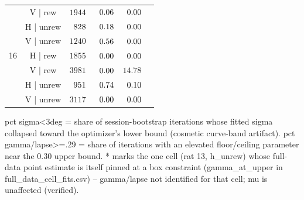 \begin{table}[htbp]
\begin{tabular}{lccccc}
 & V | rew\hphantom{un} & $1944$ & $\hphantom{0}0.06$ & $\hphantom{0}0.00$ &  \\
 & H | unrew & $\hphantom{0}828$ & $\hphantom{0}0.18$ & $\hphantom{0}0.00$ &  \\
 & V | unrew & $1240$ & $\hphantom{0}0.56$ & $\hphantom{0}0.00$ &  \\
16 & H | rew\hphantom{un} & $1855$ & $\hphantom{0}0.00$ & $\hphantom{0}0.00$ &  \\
 & V | rew\hphantom{un} & $3981$ & $\hphantom{0}0.00$ & $14.78$ &  \\
 & H | unrew & $\hphantom{0}951$ & $\hphantom{0}0.74$ & $\hphantom{0}0.10$ &  \\
 & V | unrew & $3117$ & $\hphantom{0}0.00$ & $\hphantom{0}0.00$ &  \\
\bottomrule
\end{tabular}
\vspace{4pt}
\par\noindent
\begin{minipage}{\linewidth}\small pct sigma<3deg = share of session-bootstrap iterations whose fitted sigma collapsed toward the optimizer's lower bound (cosmetic curve-band artifact). pct gamma/lapse>=.29 = share of iterations with an elevated floor/ceiling parameter near the 0.30 upper bound. * marks the one cell (rat 13, h\_unrew) whose full-data point estimate is itself pinned at a box constraint (gamma\_at\_upper in full\_data\_cell\_fits.csv) -- gamma/lapse not identified for that cell; mu is unaffected (verified).\end{minipage}
\end{table}